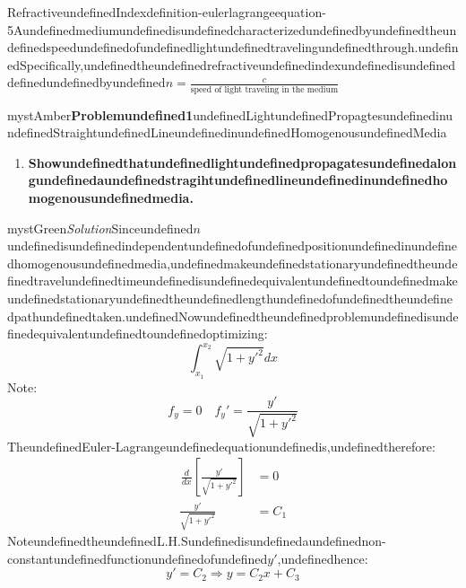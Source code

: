 \begin{mystthmdefinition}{RefractiveundefinedIndex}{definition-eulerlagrangeequation-5}Aundefinedmediumundefinedisundefinedcharacterizedundefinedbyundefinedtheundefinedspeedundefinedofundefinedlightundefinedtravelingundefinedthrough.undefinedSpecifically,undefinedtheundefinedrefractiveundefinedindexundefinedisundefineddefinedundefinedbyundefined$n=\frac{c}{\text{speed of light traveling in the medium}}$

\end{mystthmdefinition}
\begin{mystadmonition}{mystAmber}{\textbf{Problemundefined1}undefinedLightundefinedPropagtesundefinedinundefinedStraightundefinedLineundefinedinundefinedHomogenousundefinedMedia}\begin{enumerate}
\item \textbf{Showundefinedthatundefinedlightundefinedpropagatesundefinedalongundefinedaundefinedstragihtundefinedlineundefinedinundefinedhomogenousundefinedmedia.}
\end{enumerate}

\end{mystadmonition}
\begin{mystadmonition}{mystGreen}{\emph{Solution}}Sinceundefined$n$undefinedisundefinedindependentundefinedofundefinedpositionundefinedinundefinedhomogenousundefinedmedia,undefinedmakeundefinedstationaryundefinedtheundefinedtravelundefinedtimeundefinedisundefinedequivalentundefinedtoundefinedmakeundefinedstationaryundefinedtheundefinedlengthundefinedofundefinedtheundefinedpathundefinedtaken.undefinedNowundefinedtheundefinedproblemundefinedisundefinedequivalentundefinedtoundefinedoptimizing:
\begin{equation}
\int_{x_1}^{x_2} \sqrt{1+y'^2}dx
\end{equation}
Note:
\begin{equation}
f_y = 0 \quad f_y' = \frac{y'}{\sqrt{1+y'^2}}
\end{equation}
TheundefinedEuler-Lagrangeundefinedequationundefinedis,undefinedtherefore:
\begin{equation}
\begin{aligned}
\frac{}{}
    \frac{d}{dx}\left[ \frac{y'}{\sqrt{1+y'^2}}\right] &= 0 \\
    \frac{y'}{\sqrt{1+y'^2}} &= C_1
\end{aligned}
\end{equation}
NoteundefinedtheundefinedL.H.Sundefinedisundefinedaundefinednon-constantundefinedfunctionundefinedofundefined$y'$,undefinedhence:
\begin{equation}
y'= C_2 \Longrightarrow y=C_2x+C_3
\end{equation}

\end{mystadmonition}
